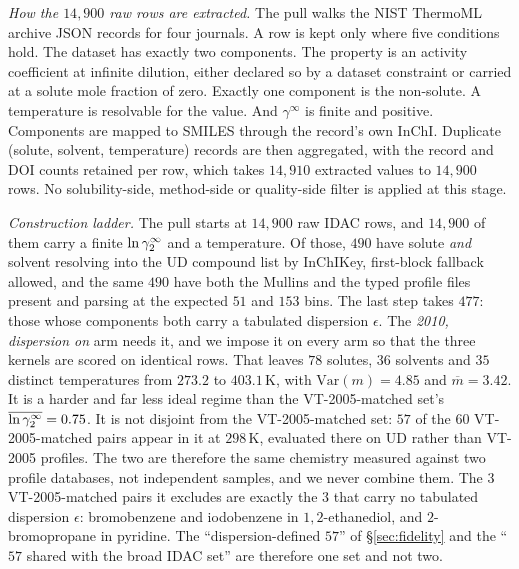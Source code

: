 \emph{How the $14{,}900$ raw rows are extracted.} The pull walks the NIST ThermoML archive JSON
records for four journals. A row is kept only where five conditions hold. The dataset has exactly
two components. The property is an activity coefficient at infinite dilution, either declared so by
a dataset constraint or carried at a solute mole fraction of zero. Exactly one component is the
non-solute. A temperature is resolvable for the value. And $\gamma^\infty$ is finite and
positive. Components are mapped to
SMILES through the record's own InChI. Duplicate (solute, solvent, temperature) records are then
aggregated, with the record and DOI counts retained per row, which takes $14{,}910$ extracted values
to $14{,}900$ rows. No solubility-side, method-side or quality-side filter is applied at this stage.

\emph{Construction ladder.} The pull starts at $14{,}900$ raw IDAC rows, and $14{,}900$ of them
carry a finite $\ln\gamma_2^\infty$ and a temperature. Of those, $490$ have solute \emph{and} solvent resolving
into the UD compound list by InChIKey, first-block fallback allowed, and the same $490$ have both
the Mullins and the typed profile files present and parsing at the expected $51$ and $153$ bins.
The last step takes $477$: those whose components both carry a tabulated dispersion $\epsilon$. The
\emph{2010, dispersion on} arm needs it, and we impose it on every arm so that the three kernels are
scored on identical rows. That leaves $78$ solutes, $36$ solvents and $35$ distinct temperatures
from $273.2$ to $403.1$\,K, with $\mathrm{Var}(m)=4.85$ and $\overline{m}=3.42$. It is a harder and
far less ideal regime than the VT-2005-matched set's $\overline{\ln\gamma_2^\infty}=0.75$. It is not disjoint from the VT-2005-matched set: $57$ of the $60$ VT-2005-matched pairs appear in
it at $298$\,K, evaluated there on UD rather than VT-2005 profiles. The two are therefore the same
chemistry measured against two profile databases, not independent samples, and we never combine them.
The $3$ VT-2005-matched pairs it excludes are exactly the $3$ that carry no tabulated dispersion $\epsilon$:
bromobenzene and iodobenzene in $1,2$-ethanediol, and $2$-bromopropane in pyridine. The
``dispersion-defined $57$'' of \S\ref{sec:fidelity} and the ``$57$ shared with the broad IDAC
set'' are therefore one set and not two.

